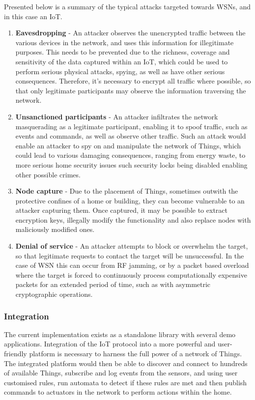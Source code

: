 \documentclass{mprop}
\begin{document}
Presented below is a summary of the typical attacks targeted towards WSNs, and in this case an IoT.
\begin{enumerate}
  \item \textbf{Eavesdropping} - An attacker observes the unencrypted traffic between the various devices in the network, and uses this information for illegitimate purposes. This needs to be prevented due to the richness, coverage and sensitivity of the data captured within an IoT, which could be used to perform serious physical attacks, spying, as well as have other serious consequences. Therefore, it's necessary to encrypt all traffic where possible, so that only legitimate participants may observe the information traversing the network.
  \item \textbf{Unsanctioned participants} - An attacker infiltrates the network masquerading as a legitimate participant, enabling it to spoof traffic, such as events and commands, as well as observe other traffic. Such an attack would enable an attacker to spy on and manipulate the network of Things, which could lead to various damaging consequences, ranging from energy waste, to more serious home security issues such security locks being disabled enabling other possible crimes.
  \item \textbf{Node capture} - Due to the placement of Things, sometimes outwith the protective confines of a home or building, they can become vulnerable to an attacker capturing them. Once captured, it may be possible to extract encryption keys, illegally modify the functionality and also replace nodes with maliciously modified ones.
  \item \textbf{Denial of service} - An attacker attempts to block or overwhelm the target, so that legitimate requests to contact the target will be unsuccessful. In the case of WSN this can occur from RF jamming, or by a packet based overload where the target is forced to continuously process computationally expensive packets for an extended period of time, such as with asymmetric cryptographic operations. 
\end{enumerate}



\subsubsection{Integration} %
\label{ssub:integration}

The current implementation exists as a standalone library with several demo applications. Integration of the IoT protocol into a more powerful and user-friendly platform is necessary to harness the full power of a network of Things. The integrated platform would then be able to discover and connect to hundreds of available Things, subscribe and log events from the sensors, and using user customised rules, run automata to detect if these rules are met and then publish commands to actuators in the network to perform actions within the home.
\end{document}
